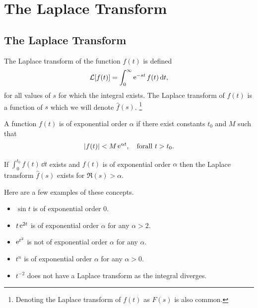 \flushbottom











\chapter{The Laplace Transform}



\section{The Laplace Transform}


The Laplace transform of the function $f(t)$ is defined
\[
\mathcal{L}[f(t)] = \int_0^\infty \mathop{\mathrm{e}}\nolimits^{-s t} f(t)\,\mathrm{d} t,
\]
for all values of $s$ for which the integral exists.
The Laplace transform of $f(t)$ is a function of $s$ which we will
denote $\hat{f}(s)$.
\footnote{Denoting the Laplace transform of $f(t)$ 
  as $F(s)$ is also common.}


A function $f(t)$ is of exponential order $\alpha$ if there exist constants
$t_0$ and $M$ such that 
\[ 
|f(t)| < M \mathop{\mathrm{e}}\nolimits^{\alpha t}, \quad \mathrm{for all}\ t > t_0.
\]

If $\int_0^{t_0} f(t)\,\dd t$ exists 
and $f(t)$ is of exponential order $\alpha$ then the Laplace transform $\hat{f}(s)$
exists for $\Re(s) > \alpha$.

Here are a few examples of these concepts.
\begin{itemize}
\item $\sin t$ is of exponential order $0$.
\item $t \mathop{\mathrm{e}}\nolimits^{2 t}$ is of exponential order $\alpha$ for any $\alpha > 2$.
\item $\mathop{\mathrm{e}}\nolimits^{t^2}$ is not of exponential order $\alpha$ for any $\alpha$.
\item $t^n$ is of exponential order $\alpha$ for any $\alpha > 0$.
\item $t^{-2}$ does not have a Laplace transform as the integral diverges.
\end{itemize}





